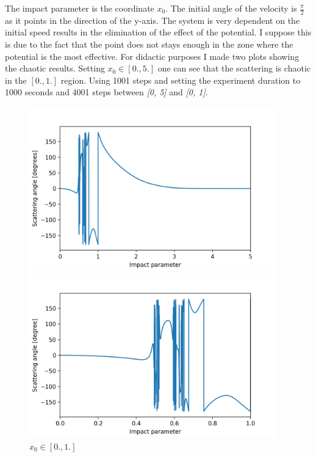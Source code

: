 \documentclass[a4paper,12pt]{article}
\begin{document}
\par The impact parameter is the coordinate $x_{0}$. The initial angle of the
velocity is $\frac{\pi}{2}$ as it points in the direction of the y-axis. The system
is very dependent on the initial speed results in the elimination of the effect of
the potential. I suppose this is due to the fact that the point does not stays enough
in the zone where the potential is the most effective. For didactic purposes I made two
plots showing the chaotic results. Setting $x_{0} \in [0., 5.]$ one can see that
the scattering is chaotic in the $[0. ,1.]$ region. Using 1001 steps and setting the
experiment duration to 1000 seconds and 4001 steps between \textit{[0, 5]} and
\textit{[0, 1]}.

\begin{figure}[H]
	\centering
	\begin{minipage}{0.5\textwidth}
		\centering
		\includegraphics[width=0.95\textwidth]{./chaotic-scattering1.png}
		\caption{ $x_{0} \in [0., 5.]$ }
	\end{minipage}\hfill
	\begin{minipage}{0.5\textwidth}
		\centering
		\includegraphics[width=0.95\textwidth]{./chaotic-scattering2.png}
		\caption{$x_{0} \in [0., 1.]$}
	\end{minipage}
\end{figure}
\end{document}
